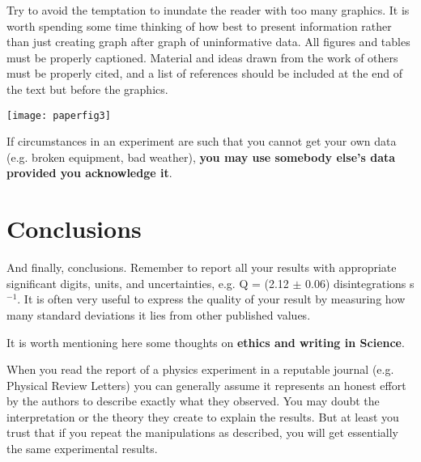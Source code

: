 \documentclass[aps,twocolumn,secnumarabic,nobalancelastpage,amsmath,amssymb,nofootinbib]{revtex4}
\begin{document}
Try to avoid the temptation to inundate the reader with too many
graphics.  It is worth spending some time thinking of how best to
present information rather than just creating graph after graph of
uninformative data.  All figures and tables must be properly
captioned.  Material and ideas drawn from the work of others must be
properly cited, and a list of references should be included at the end
of the text but before the graphics.



\begin{figure*}[htb]
\texttt{[image: paperfig3]}
\caption{Sample paneled figure created in Matlab using the
subplot(2,2,x) command where x is the element of the plot array into
which all subsequent commands such as plot(x,y) and xlabel('Volts'),
etc. get processed.  Use the caption space to provide more details
about the data, their acquisition or how they were processed if you do
not have sufficient room in the main body of text.  Figures can be
rotated using the angle command, see the TeX file for details.  If a
figure is to be placed after the main text use the ``figure*'' option
to make it extend over two columns, see the \LaTeX file for how this
was done.}
\label{fig:panel2x2}
\end{figure*}


If circumstances in an experiment are such that you cannot get your
own data (e.g. broken equipment, bad weather), {\bf you may use
somebody else's data provided you acknowledge it}.




\section{Conclusions}

And finally, conclusions.  Remember to report all your results with
appropriate significant digits, units, and uncertainties, e.g. Q =
(2.12 $\pm$ 0.06) disintegrations s$^{-1}$.  It is often very useful
to express the quality of your result by measuring how many standard
deviations it lies from other published values.

It is worth mentioning here some thoughts on {\bf ethics and writing
in Science}.

When you read the report of a physics experiment in a reputable
journal (e.g. Physical Review Letters) you can generally assume it
represents an honest effort by the authors to describe exactly what
they observed. You may doubt the interpretation or the theory they
create to explain the results. But at least you trust that if you
repeat the manipulations as described, you will get essentially the
same experimental results.
\end{document}
